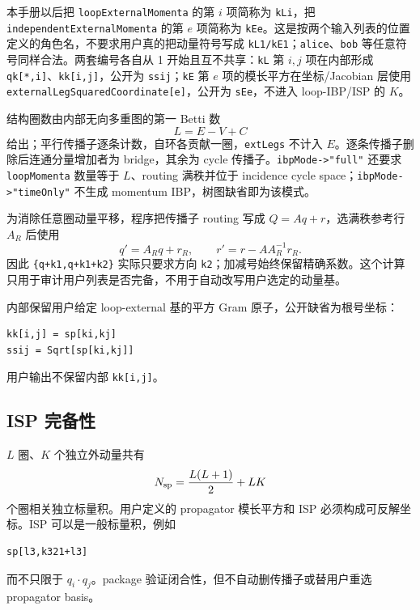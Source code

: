 ﻿\documentclass[a4paper,11pt]{article}
\begin{document}
本手册以后把 \texttt{loopExternalMomenta} 的第 $i$ 项简称为 \texttt{kLi}，把 \texttt{independentExternalMomenta} 的第 $e$ 项简称为 \texttt{kEe}。这是按两个输入列表的位置定义的角色名，不要求用户真的把动量符号写成 \texttt{kL1/kE1}；\texttt{alice}、\texttt{bob} 等任意符号同样合法。两套编号各自从 1 开始且互不共享：\texttt{kL} 第 $i,j$ 项在内部形成 \texttt{qk[*,i]}、\texttt{kk[i,j]}，公开为 \texttt{ssij}；\texttt{kE} 第 $e$ 项的模长平方在坐标/Jacobian 层使用 \texttt{externalLegSquaredCoordinate[e]}，公开为 \texttt{sEe}，不进入 loop-IBP/ISP 的 $K$。

结构圈数由内部无向多重图的第一 Betti 数
\begin{equation}
 L=E-V+C
\end{equation}
给出；平行传播子逐条计数，自环各贡献一圈，\texttt{extLegs} 不计入 $E$。逐条传播子删除后连通分量增加者为 bridge，其余为 cycle 传播子。\texttt{ibpMode->"full"} 还要求 \texttt{loopMomenta} 数量等于 $L$、routing 满秩并位于 incidence cycle space；\texttt{ibpMode->"timeOnly"} 不生成 momentum IBP，树图缺省即为该模式。

为消除任意圈动量平移，程序把传播子 routing 写成 $Q=Aq+r$，选满秩参考行 $A_R$ 后使用
\begin{equation}
 q'=A_Rq+r_R,\qquad r'=r-AA_R^{-1}r_R.
\end{equation}
因此 \texttt{\{q+k1,q+k1+k2\}} 实际只要求方向 \texttt{k2}；加减号始终保留精确系数。这个计算只用于审计用户列表是否完备，不用于自动改写用户选定的动量基。

内部保留用户给定 loop-external 基的平方 Gram 原子，公开缺省为根号坐标：
\begin{verbatim}
kk[i,j] = sp[ki,kj]
ssij = Sqrt[sp[ki,kj]]
\end{verbatim}
用户输出不保留内部 \texttt{kk[i,j]}。

\subsection{ISP 完备性}

$L$ 圈、$K$ 个独立外动量共有
\begin{equation}
 N_{\rm sp}=\frac{L(L+1)}2+LK
\end{equation}
个圈相关独立标量积。用户定义的 propagator 模长平方和 ISP 必须构成可反解坐标。ISP 可以是一般标量积，例如
\begin{verbatim}
sp[l3,k321+l3]
\end{verbatim}
而不只限于 $q_i\cdot q_j$。package 验证闭合性，但不自动删传播子或替用户重选 propagator basis。
\end{document}

